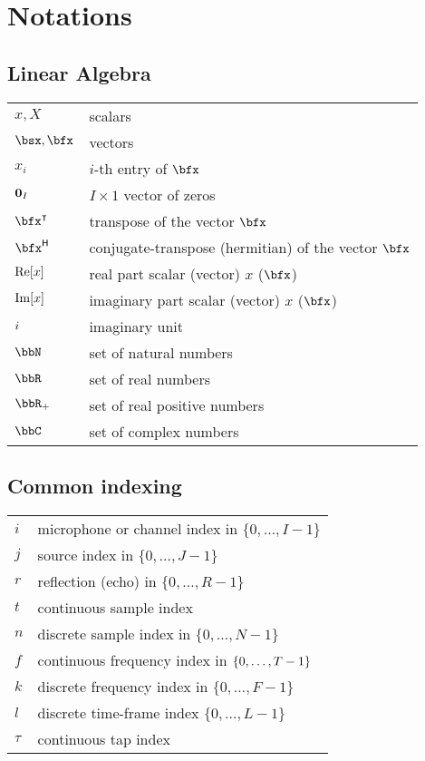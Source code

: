 \chapter*{Notations}\label{ch:notation}

\section*{Linear Algebra}
\begin{table}[H]
    \begin{tabular}{ll}
        $x, X$     & scalars      \\
        $\bsx, \bfx$  & vectors      \\
        $x_i$   & $i$-th entry of $\bfx$ \\
        $\mathbf{0}_I$ & $I\times1$ vector of zeros\\
        $\ktranspose{\bfx}$   & transpose of the vector $\bfx$ \\
        $\khermitian{\bfx}$   & conjugate-transpose (hermitian) of the vector $\bfx$ \\
        $\operatorname{Re}[x]$ & real part scalar (vector) $x$ ($\bfx$) \\
        $\operatorname{Im}[x]$ & imaginary part scalar (vector) $x$ ($\bfx$) \\
        ${i}$  & imaginary unit \\
        $\bbN$    & set of natural numbers \\
        $\bbR$    & set of real numbers \\
        $\bbR_{+}$  & set of real positive numbers \\
        $\bbC$      & set of complex numbers \\
    \end{tabular}
\end{table}

\section*{Common indexing}
\begin{table}[H]
    \begin{tabular}{ll}
        $i$     & microphone or channel index in $\{0, \ldots, I-1\}$      \\
        $j$     & source index in $\{0, \ldots, J-1\}$      \\
        $r$     & reflection (echo) in $\{0, \ldots, R-1\}$      \\
        $t$     & continuous sample index\\
        $n$     & discrete sample index in $\{0, \ldots, N-1\}$ \\
        $f$     & continuous frequency index in $\set{0, \ldots, T-1}$\\
        $k$     & discrete frequency index in $\{0, \ldots, F-1\}$ \\
        $l$     & discrete time-frame index $\{0, \ldots, L-1\}$\\
        $\tau$  & continuous tap index
    \end{tabular}
\end{table}

